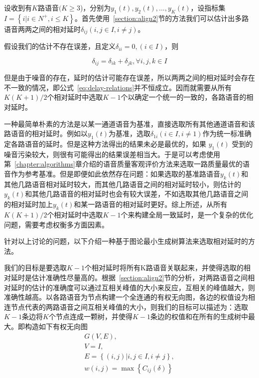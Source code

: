 设收到有$K$路语音$(K\geq3$)，分别为$y_1(t), y_2(t), ..., y_K(t)$，设指标集$I=\left\{i|i\in N^+, i\leq K\right\}$。首先使用~\ref{section:align2}节的方法我们可以估计出多路语音两两之间的相对延时$\delta_{ij}  (i,j\in I,i\neq j)$。

假设我们的估计不存在误差，且定义$\delta_{ii}=0,(i \in I)$，则

\begin{equation}\label{eq:delay-relations}
\delta_{ij}=\delta_{ik}+\delta_{jk}, \forall i,j,k \in I
\end{equation}

但是由于噪音的存在，延时的估计可能存在误差，所以两两之间的相对延时会存在不一致的情况，即公式~\ref{eq:delay-relations}并不恒成立。因而就需要从所有$K(K+1)/2$个相对延时中选取$K-1$个以确定一个统一的一致的，各路语音的相对延时。

一种最简单朴素的方法是以某一通道语音为基准，直接选取所有其他通道语音和该路语音的相对延时。例如以$y_1 (t)$为基准，选取$\delta_{1i}  (i \in I, i \neq 1)$作为统一标准确定各路语音的延时。但是这种方法得出的结果未必是最优的，如果 $y_1 (t)$ 受到的噪音污染较大，则很有可能得出的结果误差相当大。于是可以考虑使用第~\ref{chapter:algorithms}章介绍的语音质量客观评价方法来选取一路质量最优的语音作为参考基准。但是即便如此依然存在问题：如果选取的基准路语音$y_k (t)$和其他几路语音相对延时较大，而其他几路语音之间的相对延时较小，则估计的$y_k (t)$和其他几路语音的相对延时也会有较大误差，不如选取其他几路语音之间的相对延时加上$y_k (t)$和某一路语音的相对延时更好。综上所述，从所有$K(K+1)/2$个相对延时中选取$K-1$个来构建全局一致延时，是一个复杂的优化问题，需要考虑权衡多方面因素。

针对以上讨论的问题，以下介绍一种基于图论最小生成树算法来选取相对延时的方法。

我们的目标是要选取$K-1$个相对延时将所有K路语音关联起来，并使得选取的相对延时是估计准确性尽量高的。根据~\ref{section:align2}节的分析，对两路语音之间相对延时的估计的准确度可以通过互相关峰值的大小来反应，互相关的峰值越大，则准确性越高。以各路语音为节点构建一个全连通的有权无向图，各边的权值设为相连节点代表的两路语音之间互相关峰值的大小，则我们的目标可以描述为：选取$K-1$条边将$K$个节点连成一颗树，并使得$K-1$条边的权值和在所有的生成树中最大。即构造如下有权无向图
\begin{equation}
\begin{array}{l}
G(V,E), \\
V = I, \\
E = \left\{(i,j)|i, j\in I, i \neq j\right\}, \\
w(i,j)=\max⁡ \left\{ C_{ij}(\delta) \right\}
\end{array}
\end{equation}

